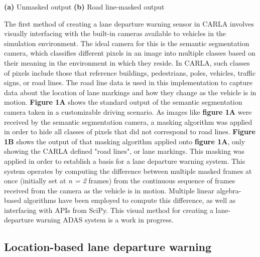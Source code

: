 \documentclass[12pt]{article}
\renewcommand{\_}{\kern-1.5pt\textunderscore\kern-1.5pt}
\begin{document}
\hspace{2cm} \textbf{(a) } Unmasked output \hspace{2.75cm} \textbf{(b) }Road line-masked output \par
\vspace{\baselineskip}
The first method of creating a lane departure warning sensor in CARLA involves visually interfacing with the built-in cameras available to vehicles in the simulation environment. The ideal camera for this is the semantic segmentation camera, which classifies different pixels in an image into multiple classes based on their meaning in the environment in which they reside. In CARLA, such classes of pixels include those that reference buildings, pedestrians, poles, vehicles, traffic signs, or road lines. The road line data is used in this implementation to capture data about the location of lane markings and how they change as the vehicle is in motion.\textbf{ Figure 1A} shows the standard output of the semantic segmentation camera taken in a customizable driving scenario. As images like \textbf{figure 1A }were received by the semantic segmentation camera, a masking algorithm was applied in order to hide all classes of pixels that did not correspond to road lines. \textbf{Figure 1B }shows the output of that masking algorithm applied onto \textbf{figure 1A}, only showing the CARLA defined "road lines", or lane markings. This masking was applied in order to establish a basis for a lane departure warning system. This system operates by computing the difference between multiple masked frames at once (initially set at \textit{n = 2} frames) from the continuous sequence of frames received from the camera as the vehicle is in motion. Multiple linear algebra-based algorithms have been employed to compute this difference, as well as interfacing with APIs from SciPy. This visual method for creating a lane-departure warning ADAS system is a work in progress.\par

\subsection{Location-based lane departure warning}

\end{document}
